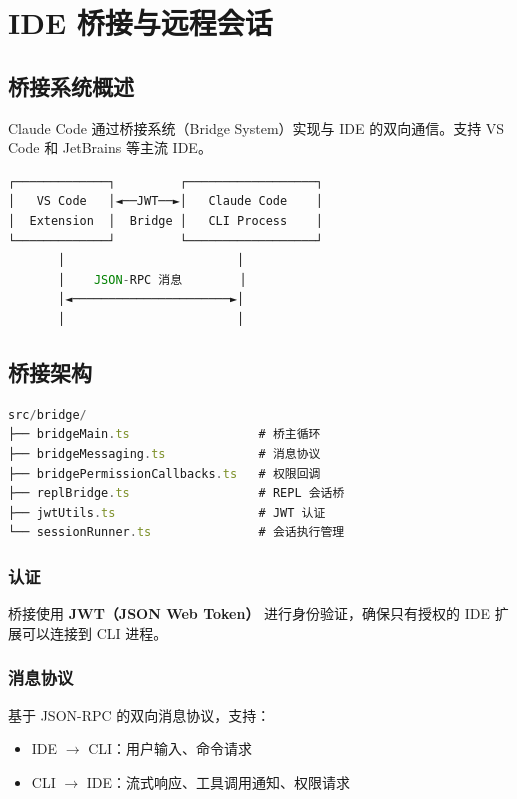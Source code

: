 \chapter{IDE 桥接与远程会话}

\section{桥接系统概述}

Claude Code 通过桥接系统（Bridge System）实现与 IDE 的双向通信。支持 VS Code 和 JetBrains 等主流 IDE。

\begin{lstlisting}[language=TypeScript,breaklines=true]
┌─────────────┐         ┌──────────────────┐
│   VS Code   │◄──JWT──►│   Claude Code    │
│  Extension  │  Bridge │   CLI Process    │
└─────────────┘         └──────────────────┘
       │                        │
       │    JSON-RPC 消息        │
       │◄──────────────────────►│
       │                        │
\end{lstlisting}

\section{桥接架构}

\begin{lstlisting}[language=TypeScript,breaklines=true]
src/bridge/
├── bridgeMain.ts                  # 桥主循环
├── bridgeMessaging.ts             # 消息协议
├── bridgePermissionCallbacks.ts   # 权限回调
├── replBridge.ts                  # REPL 会话桥
├── jwtUtils.ts                    # JWT 认证
└── sessionRunner.ts               # 会话执行管理
\end{lstlisting}

\subsection{认证}

桥接使用 \textbf{JWT（JSON Web Token）} 进行身份验证，确保只有授权的 IDE 扩展可以连接到 CLI 进程。

\subsection{消息协议}

基于 JSON-RPC 的双向消息协议，支持：
\begin{itemize}[nosep]
  \item IDE $\rightarrow$ CLI：用户输入、命令请求
  \item CLI $\rightarrow$ IDE：流式响应、工具调用通知、权限请求
\end{itemize}

